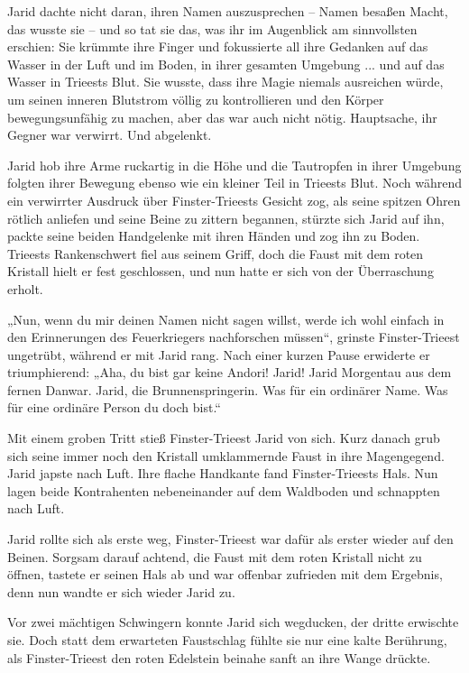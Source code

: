 Jarid dachte nicht daran, ihren Namen auszusprechen – Namen besaßen Macht, das wusste sie – und so tat sie das, was ihr im Augenblick am sinnvollsten erschien: Sie krümmte ihre Finger und fokussierte all ihre Gedanken auf das Wasser in der Luft und im Boden, in ihrer gesamten Umgebung ... und auf das Wasser in Trieests Blut. Sie wusste, dass ihre Magie niemals ausreichen würde, um seinen inneren Blutstrom völlig zu kontrollieren und den Körper bewegungsunfähig zu machen, aber das war auch nicht nötig. Hauptsache, ihr Gegner war verwirrt. Und abgelenkt.

Jarid hob ihre Arme ruckartig in die Höhe und die Tautropfen in ihrer Umgebung folgten ihrer Bewegung ebenso wie ein kleiner Teil in Trieests Blut. Noch während ein verwirrter Ausdruck über Finster-Trieests Gesicht zog, als seine spitzen Ohren rötlich anliefen und seine Beine zu zittern begannen, stürzte sich Jarid auf ihn, packte seine beiden Handgelenke mit ihren Händen und zog ihn zu Boden. Trieests Rankenschwert fiel aus seinem Griff, doch die Faust mit dem roten Kristall hielt er fest geschlossen, und nun hatte er sich von der Überraschung erholt.

„Nun, wenn du mir deinen Namen nicht sagen willst, werde ich wohl einfach in den Erinnerungen des Feuerkriegers nachforschen müssen“, grinste Finster-Trieest ungetrübt, während er mit Jarid rang. Nach einer kurzen Pause erwiderte er triumphierend: „Aha, du bist gar keine Andori! Jarid! Jarid Morgentau aus dem fernen Danwar. Jarid, die Brunnenspringerin. Was für ein ordinärer Name. Was für eine ordinäre Person du doch bist.“

Mit einem groben Tritt stieß Finster-Trieest Jarid von sich. Kurz danach grub sich seine immer noch den Kristall umklammernde Faust in ihre Magengegend. Jarid japste nach Luft. Ihre flache Handkante fand Finster-Trieests Hals. Nun lagen beide Kontrahenten nebeneinander auf dem Waldboden und schnappten nach Luft.

Jarid rollte sich als erste weg, Finster-Trieest war dafür als erster wieder auf den Beinen. Sorgsam darauf achtend, die Faust mit dem roten Kristall nicht zu öffnen, tastete er seinen Hals ab und war offenbar zufrieden mit dem Ergebnis, denn nun wandte er sich wieder Jarid zu.

Vor zwei mächtigen Schwingern konnte Jarid sich wegducken, der dritte erwischte sie. Doch statt dem erwarteten Faustschlag fühlte sie nur eine kalte Berührung, als Finster-Trieest den roten Edelstein beinahe sanft an ihre Wange drückte.

